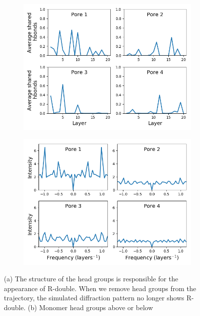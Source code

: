 \documentclass[journal=jpcbfk,manusciprt=article]{achemso}
\begin{document}
\begin{figure}[!htb]
\begin{subfigure}{0.45\textwidth}
  \caption{}\label{fig:hbond_visualization}
  \end{subfigure}
  \begin{subfigure}{0.45\textwidth}
  \includegraphics[width=\textwidth]{pore_hbonds.png}
  \caption{}\label{fig:pore_hbonds}
  \end{subfigure}
  \begin{subfigure}{0.45\textwidth}
  \includegraphics[width=\textwidth]{pore_hbonds_ft.png}
  \caption{}\label{fig:pore_hbonds_ft}
  \end{subfigure}
  \caption{(a) The structure of the head groups is responsible for the appearance of
  R-double. When we remove head groups from the trajectory, the simulated 
  diffraction pattern no longer shows R-double. (b) Monomer head groups above or below
}
\end{figure}
\end{document}
